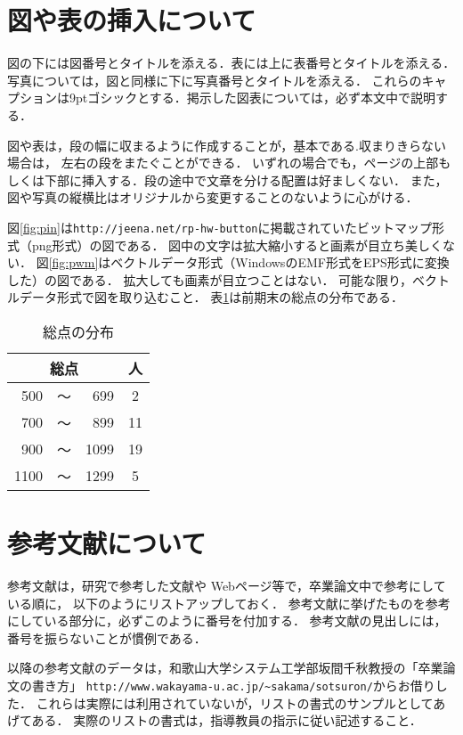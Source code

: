 \documentclass[twocolumn,fleqn]{jsarticle}
\begin{document}
\section{図や表の挿入について}
図の下には図番号とタイトルを添える．表には上に表番号とタイトルを添える．
写真については，図と同様に下に写真番号とタイトルを添える．
これらのキャプションは9ptゴシックとする．掲示した図表については，必ず本文中で説明する．

図や表は，段の幅に収まるように作成することが，基本である.収まりきらない場合は，
左右の段をまたぐことができる．
いずれの場合でも，ページの上部もしくは下部に挿入する．段の途中で文章を分ける配置は好ましくない．
また，図や写真の縦横比はオリジナルから変更することのないように心がける．

図\ref{fig:pin}は\verb|http://jeena.net/rp-hw-button|に掲載されていたビットマップ形式（png形式）の図である．
図中の文字は拡大縮小すると画素が目立ち美しくない．
\mbox{図\ref{fig:pwm}}はベクトルデータ形式（WindowsのEMF形式をEPS形式に変換した）の図である．
拡大しても画素が目立つことはない．
可能な限り，ベクトルデータ形式で図を取り込むこと．
表\ref{tbl:tbl1}は前期末の総点の分布である．
\begin{table}[tb]
\begin{center}
\caption{総点の分布}
\label{tbl:tbl1}
\begin{tabular}{|rcr|c|}\hline
\multicolumn{3}{|c|}{総点}&人\\\hline\hline
 500&～& 699&2\\\hline
 700&～& 899&11\\\hline
 900&～&1099&19\\\hline
1100&～&1299&5\\\hline
\end{tabular}
\end{center}
\end{table}%

\section{参考文献について}
参考文献は，研究で参考した文献や Webページ等で，卒業論文中で参考にしている順に，
以下のようにリストアップしておく．
参考文献に挙げたものを参考にしている部分に，必ずこのように番号を付加する\cite{長尾}．
参考文献の見出しには，番号を振らないことが慣例である．

\cite{長尾}以降の参考文献のデータは，和歌山大学システム工学部坂間千秋教授の「卒業論文の書き方」
{\small\verb|http://www.wakayama-u.ac.jp/~sakama/sotsuron/|}からお借りした．
これらは実際には利用されていないが，リストの書式のサンプルとしてあげてある．
実際のリストの書式は，指導教員の指示に従い記述すること．
\end{document}
